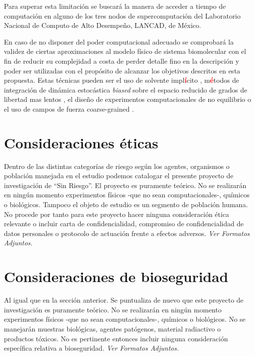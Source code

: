 \documentclass[12pt,letterpaper]{article} %
\newcommand{\red}[1]{\textcolor{red}{\textbf{#1}}}
\newcommand{\tout}[1]{\red{\textst{#1}}}
\begin{document}
Para superar esta limitación se buscará la manera de acceder a tiempo de
computación en alguno de los tres nodos de supercomputación del Laboratorio
Nacional de Computo de Alto Desempeño, LANCAD, de México.

En caso de no disponer del poder computacional adecuado se comprobará la validez
de ciertas aproximaciones al modelo físico de sistema biomolecular con el fin de
reducir su complejidad a costa de perder detalle fino en la descripción y poder
ser utilizadas con el propósito de alcanzar los objetivos descritos en esta
propuesta. Estas técnicas pueden ser el uso de solvente impl\red{í}cito
\red{\cite{Kleinjung2014}},\tout{ el uso de estrategias de escalado
  dimensional,} m\red{é}todos de integración de dinámica estocástica
\emph{biased} sobre el espacio reducido de grados de libertad mas lentos
\red{\cite{Wu2016}}, el diseño de experimentos computacionales de no equilibrio
\red{\cite{Sandberg2015}} o el uso de campos de fuerza coarse-grained
\red{\cite{Perilla2015}}.

\section{Consideraciones éticas}

Dentro de las distintas categorías de riesgo según los agentes, organismos o
población manejada en el estudio podemos catalogar el presente proyecto de
investigación de ``Sin Riesgo''. El proyecto es puramente teórico. No se
realizarán en ningún momento experimentos físicos -que no sean computacionales-,
químicos o biológicos. Tampoco el objeto de estudio es un segmento de población
humana. No procede por tanto para este proyecto hacer ninguna consideración
ética relevante o incluir carta de confidencialidad, compromiso de
confidencialidad de datos personales o protocolo de actuación frente a efectos
adversos. \emph{Ver Formatos Adjuntos.}

\section{Consideraciones de bioseguridad}

Al igual que en la sección anterior. Se puntualiza de nuevo que este proyecto de
investigación es puramente teórico. No se realizarán en ningún momento
experimentos físicos -que no sean computacionales-, químicos o biológicos. No se
manejarán muestras biológicas, agentes patógenos, material radiactivo o
productos tóxicos. No es pertinente entonces incluir ninguna consideración
específica relativa a bioseguridad.
\emph{Ver Formatos Adjuntos.}
\end{document}
